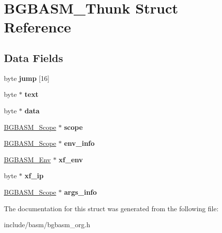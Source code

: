 \hypertarget{structBGBASM__Thunk}{\section{B\-G\-B\-A\-S\-M\-\_\-\-Thunk Struct Reference}
\label{structBGBASM__Thunk}
}
\subsection*{Data Fields}
\begin{DoxyCompactItemize}
\item 
\hypertarget{structBGBASM__Thunk_a44f53706aba092cb277ed483150a7449}{byte {\bfseries jump} \mbox{[}16\mbox{]}}\label{structBGBASM__Thunk_a44f53706aba092cb277ed483150a7449}

\item 
\hypertarget{structBGBASM__Thunk_a2e4bd7ad446ff11d03a08a8f70f54c6a}{byte $\ast$ {\bfseries text}}\label{structBGBASM__Thunk_a2e4bd7ad446ff11d03a08a8f70f54c6a}

\item 
\hypertarget{structBGBASM__Thunk_a0df82f16f64f26381b00a985a787c218}{byte $\ast$ {\bfseries data}}\label{structBGBASM__Thunk_a0df82f16f64f26381b00a985a787c218}

\item 
\hypertarget{structBGBASM__Thunk_a1217954eb2916ca96cec8898def4ec79}{\hyperlink{structBGBASM__Scope__s}{B\-G\-B\-A\-S\-M\-\_\-\-Scope} $\ast$ {\bfseries scope}}\label{structBGBASM__Thunk_a1217954eb2916ca96cec8898def4ec79}

\item 
\hypertarget{structBGBASM__Thunk_a2c2e191de0f2617980cd35db6d2308ca}{\hyperlink{structBGBASM__Scope__s}{B\-G\-B\-A\-S\-M\-\_\-\-Scope} $\ast$ {\bfseries env\-\_\-info}}\label{structBGBASM__Thunk_a2c2e191de0f2617980cd35db6d2308ca}

\item 
\hypertarget{structBGBASM__Thunk_a23b084e11269bb506349c5f9451df4e1}{\hyperlink{structBGBASM__Env__s}{B\-G\-B\-A\-S\-M\-\_\-\-Env} $\ast$ {\bfseries xf\-\_\-env}}\label{structBGBASM__Thunk_a23b084e11269bb506349c5f9451df4e1}

\item 
\hypertarget{structBGBASM__Thunk_a775ad296ba1884a1ef24241fee39d9d8}{byte $\ast$ {\bfseries xf\-\_\-ip}}\label{structBGBASM__Thunk_a775ad296ba1884a1ef24241fee39d9d8}

\item 
\hypertarget{structBGBASM__Thunk_ab8ff43e782d6c6087d4c36995ab5108f}{\hyperlink{structBGBASM__Scope__s}{B\-G\-B\-A\-S\-M\-\_\-\-Scope} $\ast$ {\bfseries args\-\_\-info}}\label{structBGBASM__Thunk_ab8ff43e782d6c6087d4c36995ab5108f}

\end{DoxyCompactItemize}


The documentation for this struct was generated from the following file\-:\begin{DoxyCompactItemize}
\item 
include/basm/bgbasm\-\_\-org.\-h\end{DoxyCompactItemize}
